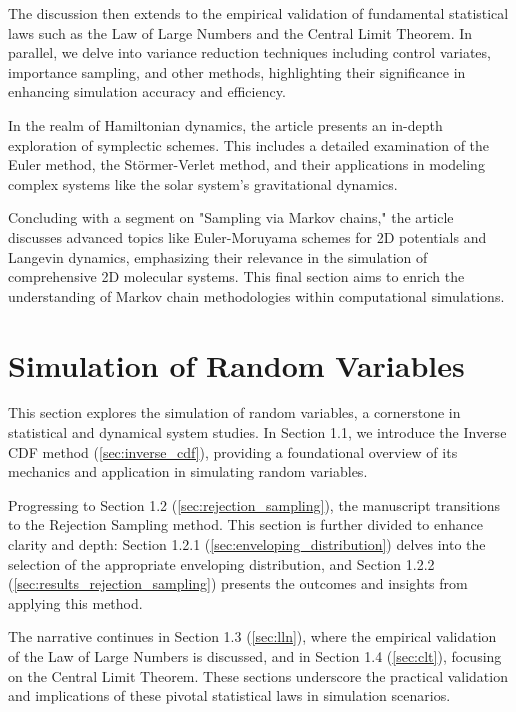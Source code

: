 \documentclass{article}
\begin{document}
The discussion then extends to the empirical validation of fundamental statistical laws such as the Law of Large Numbers and the Central Limit Theorem. In parallel, we delve into variance reduction techniques including control variates, importance sampling, and other methods, highlighting their significance in enhancing simulation accuracy and efficiency.

In the realm of Hamiltonian dynamics, the article presents an in-depth exploration of symplectic schemes. This includes a detailed examination of the Euler method, the Störmer-Verlet method, and their applications in modeling complex systems like the solar system’s gravitational dynamics.

Concluding with a segment on "Sampling via Markov chains," the article discusses advanced topics like Euler-Moruyama schemes for 2D potentials and Langevin dynamics, emphasizing their relevance in the simulation of comprehensive 2D molecular systems. This final section aims to enrich the understanding of Markov chain methodologies within computational simulations.

\section{Simulation of Random Variables}
\label{sec:simulation_of_random_variables}

This section explores the simulation of random variables, a cornerstone in statistical and dynamical system studies. In Section 1.1, we introduce the Inverse CDF method (\ref{sec:inverse_cdf}), providing a foundational overview of its mechanics and application in simulating random variables.

Progressing to Section 1.2 (\ref{sec:rejection_sampling}), the manuscript transitions to the Rejection Sampling method. This section is further divided to enhance clarity and depth: Section 1.2.1 (\ref{sec:enveloping_distribution}) delves into the selection of the appropriate enveloping distribution, and Section 1.2.2 (\ref{sec:results_rejection_sampling}) presents the outcomes and insights from applying this method.

The narrative continues in Section 1.3 (\ref{sec:lln}), where the empirical validation of the Law of Large Numbers is discussed, and in Section 1.4 (\ref{sec:clt}), focusing on the Central Limit Theorem. These sections underscore the practical validation and implications of these pivotal statistical laws in simulation scenarios.
\end{document}
